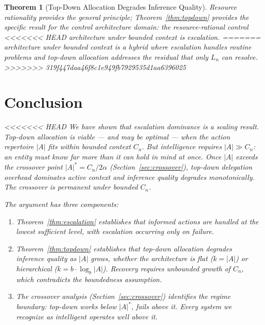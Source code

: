 \documentclass[11pt]{article}
\newtheorem{theorem}{Theorem}
\theoremstyle{definition}
\begin{document}
\begin{theorem}[Top-Down Allocation Degrades Inference Quality]
Resource rationality provides the general principle;
Theorem~\ref{thm:topdown} provides the specific result for the
control architecture domain: the resource-rational control
<<<<<<< HEAD
architecture under bounded context is escalation.
=======
architecture under bounded context is a hybrid where escalation
handles routine problems and top-down allocation addresses the
residual that only $L_n$ can resolve.
>>>>>>> 319f447daa46f8c1e949fb7929535d1aa6396025

\section{Conclusion}
\label{sec:conclusion}

<<<<<<< HEAD
We have shown that escalation dominance is a \emph{scaling result}.
Top-down allocation is viable --- and may be optimal --- when the action
repertoire $|A|$ fits within bounded context $C_n$. But intelligence
requires $|A| \gg C_n$: an entity must know far more than it can hold
in mind at once. Once $|A|$ exceeds the crossover point
$|A|^* = C_n / 2\alpha$ (Section~\ref{sec:crossover}), top-down
delegation overhead dominates active context and inference quality
degrades monotonically. The crossover is permanent under bounded $C_n$.

The argument has three components:

\begin{enumerate}
\item Theorem~\ref{thm:escalation} establishes that informed actions
   are handled at the lowest sufficient level, with escalation
   occurring only on failure.

\item Theorem~\ref{thm:topdown} establishes that top-down allocation
   degrades inference quality as $|A|$ grows, whether the architecture
   is flat ($k = |A|$) or hierarchical ($k = b \cdot \log_b |A|$).
   Recovery requires unbounded growth of $C_n$, which contradicts the
   boundedness assumption.

\item The crossover analysis (Section~\ref{sec:crossover}) identifies
   the regime boundary: top-down works below $|A|^*$, fails above it.
   Every system we recognize as intelligent operates well above it.
\end{enumerate}


\end{theorem}
\end{document}
